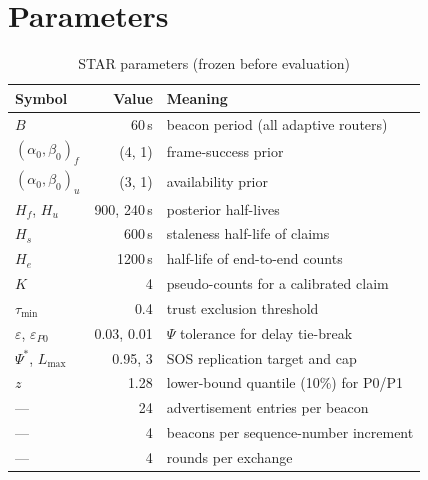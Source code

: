 \documentclass[jou,a4paper,11pt,floatsintext]{apa7}
\begin{document}
\printbibliography

\appendix
\section{Parameters}

\begin{table}[h]
\caption{STAR parameters (frozen before evaluation)}
\label{tab:params}
\small
\begin{tabularx}{\linewidth}{@{}lrY@{}}
\toprule
Symbol & Value & Meaning \\
\midrule
$B$ & 60\,s & beacon period (all adaptive routers) \\
$(\alpha_0,\beta_0)_f$ & (4, 1) & frame-success prior \\
$(\alpha_0,\beta_0)_u$ & (3, 1) & availability prior \\
$H_f$, $H_u$ & 900, 240\,s & posterior half-lives \\
$H_s$ & 600\,s & staleness half-life of claims \\
$H_e$ & 1200\,s & half-life of end-to-end counts \\
$K$ & 4 & pseudo-counts for a calibrated claim \\
$\tau_{\min}$ & 0.4 & trust exclusion threshold \\
$\varepsilon$, $\varepsilon_{P0}$ & 0.03, 0.01 & $\Psi$ tolerance for delay tie-break \\
$\Psi^\ast$, $L_{\max}$ & 0.95, 3 & SOS replication target and cap \\
$z$ & 1.28 & lower-bound quantile (10\%) for P0/P1 \\
--- & 24 & advertisement entries per beacon \\
--- & 4 & beacons per sequence-number increment \\
--- & 4 & rounds per exchange \\
\bottomrule
\end{tabularx}
\end{table}
\end{document}
